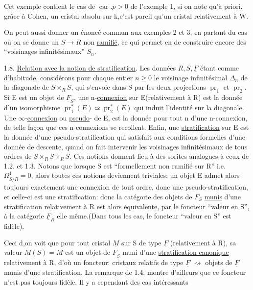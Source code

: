 
Cet exemple contient le cas de $\operatorname{car}.p>0$ de l'exemple 1, si on note qu'à priori, grâce à Cohen, un cristal absolu sur k,c'est pareil qu'un cristal relativement à W.

On peut aussi donner un énoncé commun aux  exemples 2 et 3, en partant du cas où on se donne un $S\longrightarrow R$ non \uline{ramifié}, ce qui permet en  de construire encore des ``voisinages infinitésimaux'' $S_n$.

1.8. \uline{Relation avec la notion de stratification}. Les données $R,S,\underline F$ étant comme d'habitude, considérons pour chaque entier $n\ge0$ le voisinage infinitésimal $\Delta_n$ de la diagonale de $S\times_RS$, qui s'envoie dans S par les deux projections $\operatorname{pr}_1$ et $\operatorname{pr}_2$. Si E est un objet de $\underline F_S$, une n-\uline{connexion} sur E(relativement à R) est la donnée d'un isomorphisme $\operatorname{pr}_1^*(E)\simeq\operatorname{pr}_2^*(E)$ qui induit l'identité sur la diagonale. Une $\infty$-\uline{connexion} ou \uline{pseudo}-\uline{} de E, est la donnée pour tout n d'une n-connexion, de telle façon que ces n-connexions se recollent. Enfin, une \uline{stratification} sur E est la donnée d'une pseudo-stratification qui satisfait aux conditions formelles d'une donnée de descente, quand on fait intervenir les voisinages infinitésimaux de tous ordres de  $S\times_RS\times_RS$. Ces notions donnent lieu à des sorites analogues à ceux de 1.2. et 1.3. Notons que lorsque S est ``formellement non ramifié sur R'' i.e. $\underline\Omega^1_{S/R}=0$, alors toutes ces notions deviennent triviales: un objet E admet alors toujours exactement une connexion de tout ordre, donc une  pseudo-stratification, et celle-ci est une stratification: donc la catégorie des objets de $F_S$ \uline{munis} d'une stratification relativement à R est alors équivalente, par le foncteur ``valeur en S'', à la catégorie $\underline F_R$ elle même.(Dans tous les cas, le foncteur ``valeur en S'' est  fidèle).

Ceci d,on voit que pour tout cristal $\underline M$ sur S de type $\underline F$ (relativement à R), sa  valeur $\underline M(S)=M$ est un objet de $\underline F_S$ muni d'une \uline{stratification canonique} relativement à R, d'où un foncteur: cristaux relatifs de type $\underline F$ $\rightsquigarrow$ objets de $\underline F$ munis d'une stratification. La remarque de 1.4. montre d'ailleurs que ce foncteur n'est pas toujours fidèle. Il y a cependant des cas intéressants
